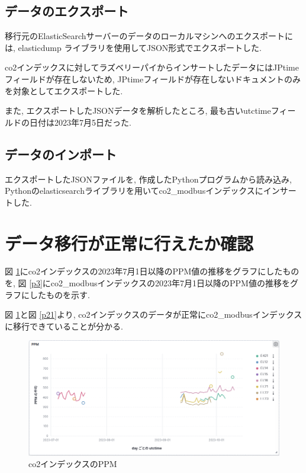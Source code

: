 \subsection{データのエクスポート}
移行元のElasticSearchサーバーのデータのローカルマシンへのエクスポートには, elasticdump \cite{1}ライブラリを使用してJSON形式でエクスポートした.

co2インデックスに対してラズベリーパイからインサートしたデータにはJPtimeフィールドが存在しないため, JPtimeフィールドが存在しないドキュメントのみを対象としてエクスポートした.

また, エクスポートしたJSONデータを解析したところ, 最も古いutctimeフィールドの日付は2023年7月5日だった.

\subsection{データのインポート}
エクスポートしたJSONファイルを, 作成したPythonプログラムから読み込み, Pythonのelasticsearchライブラリを用いてco2\_modbusインデックスにインサートした.

\section{データ移行が正常に行えたか確認}
図 \ref{p20}にco2インデックスの2023年7月1日以降のPPM値の推移をグラフにしたものを, 図 \ref{p3}にco2\_modbusインデックスの2023年7月1日以降のPPM値の推移をグラフにしたものを示す.

図 \ref{p20}と図 \ref{p21}より, co2インデックスのデータが正常にco2\_modbusインデックスに移行できていることが分かる.

\begin{figure}[!ht]
    \begin{center}
        \includegraphics[width=160mm]{sotu/figure/co2PPM.png}
        \caption{co2インデックスのPPM}
        \label{p20}
    \end{center}
\end{figure}

